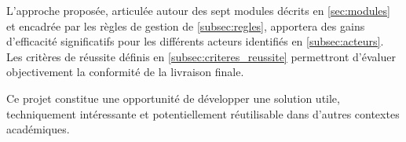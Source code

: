 \documentclass[12pt,a4paper]{article}
\begin{document}
L'approche proposée, articulée autour des sept modules décrits en
\ref{sec:modules} et encadrée par les règles de gestion de
\ref{subsec:regles}, apportera des gains d'efficacité significatifs pour les
différents acteurs identifiés en \ref{subsec:acteurs}. Les critères de réussite
définis en \ref{subsec:criteres_reussite} permettront d'évaluer objectivement
la conformité de la livraison finale.

Ce projet constitue une opportunité de développer une solution utile,
techniquement intéressante et potentiellement réutilisable dans d'autres
contextes académiques.
\end{document}
